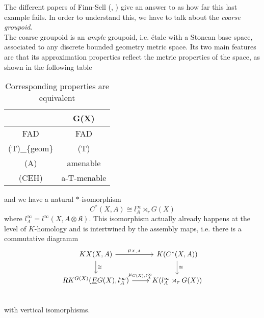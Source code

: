 The different papers of Finn-Sell (\cite{FinnSell}, \cite{FinnSellFibred}) give an answer to as how far this last example fails. In order to understand this, we have to talk about the \textit{coarse groupoid}.\\

The coarse groupoid is an \textit{ample} groupoid, i.e. \'etale with a Stonean base space, associated to any discrete bounded geometry metric space. Its two main features are that its approximation properties reflect the metric properties of the space, as shown in the following table

\begin{table}[h]
\centering
\begin{tabular}{|c|c|}
\rowcolor[HTML]{DAE8FC} 
\multicolumn{1}{|c|}{\cellcolor[HTML]{DAE8FC}\textbf{X}} & \multicolumn{1}{|c|}{\cellcolor[HTML]{DAE8FC}\textbf{G(X)}} \\ \hline
FAD                                                      & FAD                                                        \\
(T)\_\{geom\}                                            & (T)                                                        \\
(A)                                                      & amenable                                                   \\
(CEH)                                                    & a-T-menable              \\
\hline                                 
\end{tabular}
\caption{Corresponding properties are equivalent}
\end{table}
and we have a natural $*$-isomorphism
\[C^*(X,A) \cong l^\infty_A \rtimes_r G(X)\]
where $l^\infty_A = l^\infty(X,A\otimes \mathfrak K)$.
This isomorphism actually already happens at the level of $K$-homology and is intertwined by the assembly maps, i.e. there is a commutative diagramm
\[\begin{tikzcd}
KX(X,A) \arrow{r}{\mu_{X,A}} \arrow{d}{\cong}& K(C^*(X,A)) \arrow{d}{\cong}\\
RK^{G(X)}(\underline E G(X) , l^\infty_A) \arrow{r}{\mu_{G(X),l^\infty_A}}  & K(l^\infty_A \rtimes_r G(X)) \\
\end{tikzcd}\]
with vertical isomorphisms. \\

